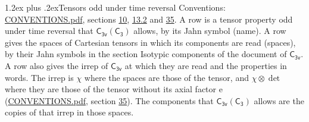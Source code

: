 \documentclass[10pt,a4paper]{article}
\makeatletter
\renewcommand\section{\@startsection{section}{1}{\z@}{-3ex plus -1ex minus -.2ex}%
  {1.2ex plus .2ex}{\normalfont\large\sffamily\bfseries\color{parttitle}}}
\numberwithin{equation}{section}
\newcommand{\grp}[1]{\mathsf{#1}}
\newcommand{\irrprod}{\otimes}
\makeatother
\begin{document}
\section{Tensors odd under time reversal}\label{s:time_odd}
Conventions: \href{../../CONVENTIONS.pdf}{CONVENTIONS.pdf}, sections \href{../../../rotation/CONVENTIONS.pdf\#conv.10}{10}, \href{../../../rotation/CONVENTIONS.pdf\#conv.13.2}{13.2} and \href{../../CONVENTIONS.pdf\#conv.35}{35}.
\leavevmode\label{n:head.name.property}A row is a tensor property odd under time reversal that $\grp{C_{3v}}(\grp{C_{3}})$ allows, by its Jahn symbol (name). \label{n:head.spaces}A row gives the spaces of Cartesian tensors in which its components are read (spaces), by their Jahn symbols in the section Isotypic components of the document of \href{../../../rotation/data/pdf/C3v.pdf}{$\grp{C_{3v}}$}. \label{n:head.properties}A row also gives the irrep of $\grp{C_{3v}}$ at which they are read and the properties in words. The irrep is $\chi$ where the spaces are those of the tensor, and $\chi \irrprod \det$ where they are those of the tensor without its axial factor e (\href{../../CONVENTIONS.pdf}{CONVENTIONS.pdf}, section \href{../../CONVENTIONS.pdf\#conv.35}{35}). The components that $\grp{C_{3v}}(\grp{C_{3}})$ allows are the copies of that irrep in those spaces.
\end{document}
